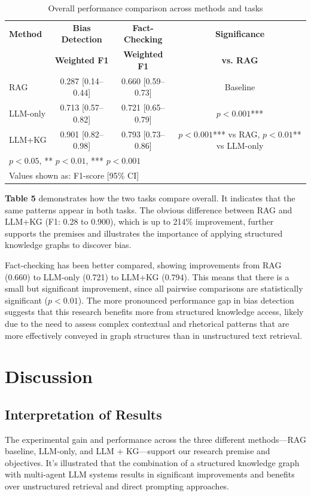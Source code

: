 \documentclass[11pt]{article}
\begin{document}
\begin{table}[htbp]
\centering
\begin{tabular}{lccc}
\toprule
\textbf{Method} & \textbf{Bias Detection} & \textbf{Fact-Checking} & \textbf{Significance} \\
 & \textbf{Weighted F1} & \textbf{Weighted F1} & \textbf{vs. RAG} \\
\midrule
RAG      & 0.287 [0.14--0.44] & 0.660 [0.59--0.73] & Baseline \\
LLM-only & 0.713 [0.57--0.82] & 0.721 [0.65--0.79] & $p<0.001$*** \\
LLM+KG   & 0.901 [0.82--0.98] & 0.793 [0.73--0.86] & $p<0.001$*** vs RAG, $p<0.01$** vs LLM-only \\
\bottomrule
\multicolumn{4}{l}{\footnotesize * $p<0.05$, ** $p<0.01$, *** $p<0.001$} \\
\multicolumn{4}{l}{\footnotesize Values shown as: F1-score [95\% CI]} \\
\end{tabular}
\caption{Overall performance comparison across methods and tasks}
\label{tab:overall_comparison}
\end{table}

\textbf{Table 5} demonstrates how the two tasks compare overall.  It indicates that the same patterns appear in both tasks.  The obvious difference  between RAG and LLM+KG (F1: 0.28 to 0.900), which is up to 214\% improvement, further supports the premises and illustrates the importance of applying structured knowledge graphs to discover bias.

Fact-checking has been better compared, showing improvements from RAG (0.660) to LLM-only (0.721) to LLM+KG (0.794).  This means that there is a small but significant improvement, since all pairwise comparisons are statistically significant ($p<0.01$).  The more pronounced performance gap in bias detection suggests that this research benefits more from structured knowledge access, likely due to the need to assess complex contextual and rhetorical patterns that are more effectively conveyed in graph structures than in unstructured text retrieval.


\section{Discussion}
\subsection{Interpretation of Results}
The experimental gain and performance across the three different methods—RAG baseline, LLM-only, and LLM + KG—support our research premise and objectives.  It's illustrated that the combination of a structured knowledge graph with multi-agent LLM systems results in significant improvements and benefits over unstructured retrieval and direct prompting approaches.
\end{document}
